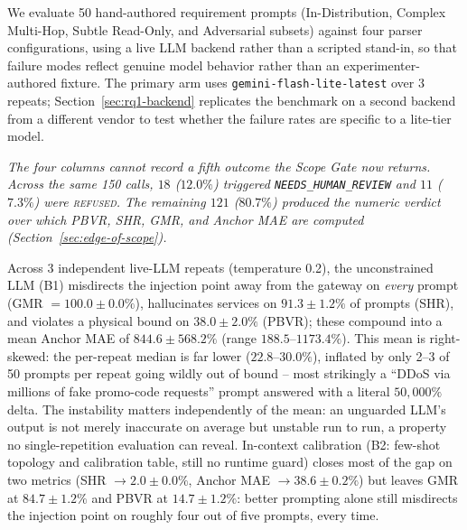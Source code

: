 \documentclass[journal, 10pt]{IEEEtran}
\begin{document}
We evaluate 50 hand-authored requirement prompts (In-Distribution, Complex Multi-Hop, Subtle Read-Only, and Adversarial subsets) against four parser configurations, using a live LLM backend rather than a scripted stand-in, so that failure modes reflect genuine model behavior rather than an experimenter-authored fixture. The primary arm uses \texttt{gemini-flash-lite-latest} over $3$ repeats; Section~\ref{sec:rq1-backend} replicates the benchmark on a second backend from a different vendor to test whether the failure rates are specific to a lite-tier model.

\begin{table}[!t]
\centering
\caption{Parser reliability, live LLM, 50 prompts, mean $\pm$ std over 3 independent repeats}
\label{tab:rq1-parser}
\end{table}
\noindent\emph{The four columns cannot record a fifth outcome the Scope Gate now returns. Across the same 150 calls, $18$ ($12.0\%$) triggered \texttt{NEEDS\_HUMAN\_REVIEW} and $11$ ($7.3\%$) were \textsc{refused}. The remaining $121$ ($80.7\%$) produced the numeric verdict over which PBVR, SHR, GMR, and Anchor MAE are computed (Section~\ref{sec:edge-of-scope}).}

Across 3 independent live-LLM repeats (temperature 0.2), the unconstrained LLM (B1) misdirects the injection point away from the gateway on \emph{every} prompt (GMR $=100.0\pm0.0\%$), hallucinates services on $91.3\pm1.2\%$ of prompts (SHR), and violates a physical bound on $38.0\pm2.0\%$ (PBVR); these compound into a mean Anchor MAE of $844.6\pm568.2\%$ (range $188.5$--$1173.4\%$). This mean is right-skewed: the per-repeat median is far lower ($22.8$--$30.0\%$), inflated by only 2--3 of 50 prompts per repeat going wildly out of bound -- most strikingly a ``DDoS via millions of fake promo-code requests'' prompt answered with a literal $50{,}000\%$ delta. The instability matters independently of the mean: an unguarded LLM's output is not merely inaccurate on average but unstable run to run, a property no single-repetition evaluation can reveal. In-context calibration (B2: few-shot topology and calibration table, still no runtime guard) closes most of the gap on two metrics (SHR $\to2.0\pm0.0\%$, Anchor MAE $\to38.6\pm0.2\%$) but leaves GMR at $84.7\pm1.2\%$ and PBVR at $14.7\pm1.2\%$: better prompting alone still misdirects the injection point on roughly four out of five prompts, every time.
\end{document}
